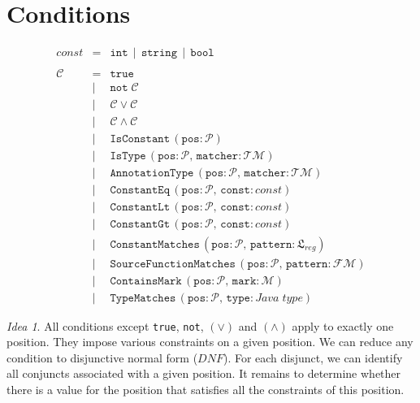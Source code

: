 \documentclass{article}
\newcommand{\lang}{\mathfrak{L}}
\newcommand{\regL}{\lang_{reg}}
\begin{document}
\section{Conditions}
\[
\begin{array}{rcl}
const       & =    & \texttt{int} \,\mid\, \texttt{string} \,\mid\, \texttt{bool} \\
\\
\mathcal{C} & =    & \texttt{true} \\
            & \mid & \texttt{not} \; \mathcal{C} \\
            & \mid & \mathcal{C} \lor \mathcal{C} \\
            & \mid & \mathcal{C} \land \mathcal{C} \\
            & \mid & \texttt{IsConstant}\,(\texttt{pos} : \mathcal{P}) \\
            & \mid & \texttt{IsType}\,(\texttt{pos} : \mathcal{P},\, \texttt{matcher} : \mathcal{TM}) \\
            & \mid & \texttt{AnnotationType}\,(\texttt{pos} : \mathcal{P},\, \texttt{matcher} : \mathcal{TM}) \\
            & \mid & \texttt{ConstantEq}\,(\texttt{pos} : \mathcal{P},\, \texttt{const} : const) \\
            & \mid & \texttt{ConstantLt}\,(\texttt{pos} : \mathcal{P},\, \texttt{const} : const) \\
            & \mid & \texttt{ConstantGt}\,(\texttt{pos} : \mathcal{P},\, \texttt{const} : const) \\
            & \mid & \texttt{ConstantMatches}\,(\texttt{pos} : \mathcal{P},\, \texttt{pattern} : \regL) \\
            & \mid & \texttt{SourceFunctionMatches}\,(\texttt{pos} : \mathcal{P},\, \texttt{pattern} : \mathcal{FM}) \\
            & \mid & \texttt{ContainsMark}\,(\texttt{pos} : \mathcal{P},\, \texttt{mark} : \mathcal{M}) \\
            & \mid & \texttt{TypeMatches}\,(\texttt{pos} : \mathcal{P},\, \texttt{type} : Java\; type)
\end{array}
\]

\noindent \textit{Idea 1}. All conditions except \texttt{true}, \texttt{not}, $(\lor)$ and $(\land)$ apply to exactly one position. They impose various constraints on a given position. We can reduce any condition to disjunctive normal form ($DNF$). For each disjunct, we can identify all conjuncts associated with a given position. It remains to determine whether there is a value for the position that satisfies all the constraints of this position.
\end{document}
